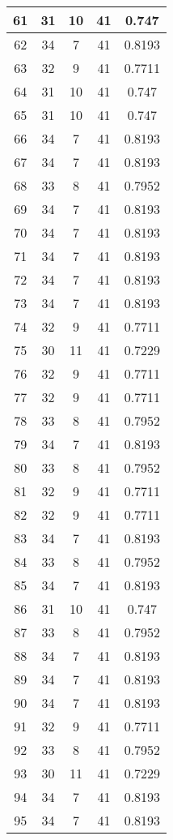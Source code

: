 \documentclass[letterpaper, 12pt]{article}
\begin{document}
\begin{longtable}{|c|c|c|c|c|}
61 & 31 & 10 & 41 & 0.747 \\
\hline
62 & 34 & 7 & 41 & 0.8193 \\
\hline
63 & 32 & 9 & 41 & 0.7711 \\
\hline
64 & 31 & 10 & 41 & 0.747 \\
\hline
65 & 31 & 10 & 41 & 0.747 \\
\hline
66 & 34 & 7 & 41 & 0.8193 \\
\hline
67 & 34 & 7 & 41 & 0.8193 \\
\hline
68 & 33 & 8 & 41 & 0.7952 \\
\hline
69 & 34 & 7 & 41 & 0.8193 \\
\hline
70 & 34 & 7 & 41 & 0.8193 \\
\hline
71 & 34 & 7 & 41 & 0.8193 \\
\hline
72 & 34 & 7 & 41 & 0.8193 \\
\hline
73 & 34 & 7 & 41 & 0.8193 \\
\hline
74 & 32 & 9 & 41 & 0.7711 \\
\hline
75 & 30 & 11 & 41 & 0.7229 \\
\hline
76 & 32 & 9 & 41 & 0.7711 \\
\hline
77 & 32 & 9 & 41 & 0.7711 \\
\hline
78 & 33 & 8 & 41 & 0.7952 \\
\hline
79 & 34 & 7 & 41 & 0.8193 \\
\hline
80 & 33 & 8 & 41 & 0.7952 \\
\hline
81 & 32 & 9 & 41 & 0.7711 \\
\hline
82 & 32 & 9 & 41 & 0.7711 \\
\hline
83 & 34 & 7 & 41 & 0.8193 \\
\hline
84 & 33 & 8 & 41 & 0.7952 \\
\hline
85 & 34 & 7 & 41 & 0.8193 \\
\hline
86 & 31 & 10 & 41 & 0.747 \\
\hline
87 & 33 & 8 & 41 & 0.7952 \\
\hline
88 & 34 & 7 & 41 & 0.8193 \\
\hline
89 & 34 & 7 & 41 & 0.8193 \\
\hline
90 & 34 & 7 & 41 & 0.8193 \\
\hline
91 & 32 & 9 & 41 & 0.7711 \\
\hline
92 & 33 & 8 & 41 & 0.7952 \\
\hline
93 & 30 & 11 & 41 & 0.7229 \\
\hline
94 & 34 & 7 & 41 & 0.8193 \\
\hline
95 & 34 & 7 & 41 & 0.8193 \\

\end{longtable}
\end{document}
